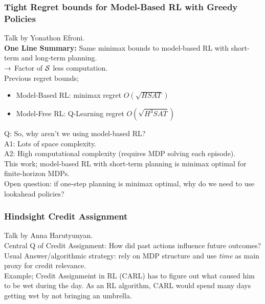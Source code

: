 \subsubsection{Tight Regret bounds for Model-Based RL with Greedy Policies \cite{efroni2019tight}}

Talk by Yonathon Efroni. \\

{\bf One Line Summary:} Same minimax bounds to model-based RL with short-term and long-term planning. \\

$\rightarrow$ Factor of $\mathcal{S}$ less computation. \\

Previous regret bounds;
\begin{itemize}
    \item Model-Based RL: minimax regret $O(\sqrt{HSAT})$
    \item Model-Free RL: Q-Learning regret $O(\sqrt{H^3SAT})$
\end{itemize}

Q: So, why aren't we using model-based RL? \\

A1: Lots of space complexity. \\
A2: High computational complexity (requires MDP solving each episode). \\

This work; model-based RL with short-term planning is minimax optimal for finite-horizon MDPs. \\

Open question: if one-step planning is minimax optimal, why do we need to use lookahead policies?

\subsubsection{Hindsight Credit Assignment \cite{harutyunyan2019hindsight}}

Talk by Anna Harutyunyan. \\

Central Q of Credit Assignment: How did past actions influence future outcomes? \\

Usual Answer/algorithmic strategy: rely on MDP structure and use {\it time} as main proxy for credit relevance. \\

Example; Credit Assignmeint in RL (CARL) has to figure out what caused him to be wet during the day. As an RL algorithm, CARL would spend many days getting wet by not bringing an umbrella. \\

